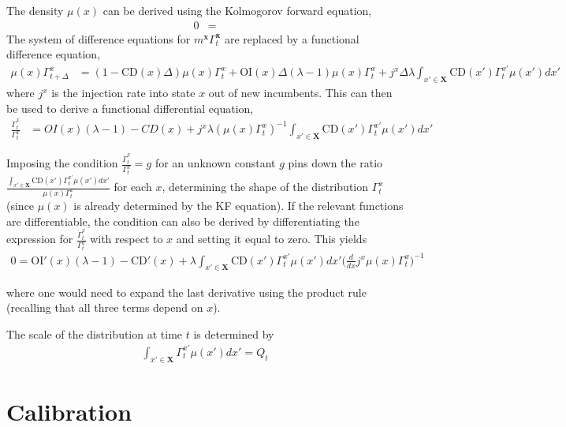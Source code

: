 \documentclass[11pt,english]{article}
\begin{document}
The density $\mu(x)$ can be derived using the Kolmogorov forward equation,
\begin{align}
0 &= 
\end{align}
The system of difference equations for $m^{\textbf{x}} \Gamma_t^{\textbf{x}}$ are replaced by a functional difference equation, 
\begin{align}
\mu(x) \Gamma_{t+\Delta}^x &= (1- \text{CD}(x) \Delta) \mu(x) \Gamma_t^x + \text{OI}(x) \Delta (\lambda -1) \mu(x) \Gamma_t^x +  j^x \Delta  \lambda \int_{x' \in \mathbf{X}} \text{CD}(x') \Gamma_t^{x'} \mu(x') dx'
\end{align}
where $j^x$ is the injection rate into state $x$ out of new incumbents. This can then be used to derive a functional differential equation,
\begin{align}
\frac{\dot{\Gamma}_{t}^x}{\Gamma_t^x} &= OI(x) (\lambda -1) - CD(x) + j^x \lambda (\mu(x) \Gamma_t^x)^{-1} \int_{x' \in \mathbf{X}} \text{CD}(x') \Gamma_t^{x'} \mu(x') dx'
\end{align}

Imposing the condition $\frac{\dot{\Gamma}_{t}^x}{\Gamma_t^x} = g$ for an unknown constant $g$ pins down the ratio $\frac{\int_{x' \in \mathbf{X}} \text{CD}(x') \Gamma_t^{x'} \mu(x') dx'}{\mu(x) \Gamma_t^x}$ for each $x$, determining the shape of the distribution $\Gamma_t^x$ (since $\mu(x)$ is already determined by the KF equation). If the relevant functions are differentiable, the condition can also be derived by differentiating the expression for $\frac{\dot{\Gamma}_t^x}{\Gamma_t^x}$ with respect to $x$ and setting it equal to zero. This yields
\begin{align}
0 = \text{OI}'(x) (\lambda -1) - \text{CD}'(x) + \lambda \int_{x' \in \mathbf{X}} \text{CD}(x') \Gamma_t^{x'} \mu(x') dx' \Big(\frac{d}{dx} j^x \mu(x) \Gamma_t^x \Big)^{-1}
\end{align} 

where one would need to expand the last derivative using the product rule (recalling that all three terms depend on $x$). 

The scale of the distribution at time $t$ is determined by 
\begin{align}
\int_{x' \in \mathbf{X}} \Gamma_t^{x'} \mu(x') dx' = Q_t
\end{align}




\section{Calibration}\label{appendix:calibration}
\end{document}
